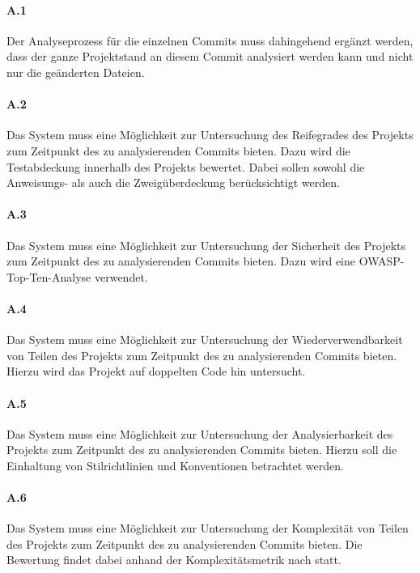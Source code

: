 \documentclass[
	oneside,  %
	ngerman, 
	final, 
	11pt, 
	a4paper, 
	1.1headlines, 
	headinclude=false, 
	footinclude=false, 
	mpinclude=false, 
	pagesize, 
	onecolumn, 
	titlepage, 
	parskip=half, 
	headsepline, 
	chapterprefix=false, 
	version=first, 
	listof=totoc, 
	bibliography=totoc, 
	toc=graduated, 
	fleqn
]{scrbook}
\begin{document}
\paragraph{A.1}
Der Analyseprozess für die einzelnen Commits muss dahingehend ergänzt werden, dass der ganze Projektstand an diesem Commit analysiert werden kann und nicht nur die geänderten Dateien.

\paragraph{A.2}
Das System muss eine Möglichkeit zur Untersuchung des Reifegrades des Projekts zum Zeitpunkt des zu analysierenden Commits bieten.
Dazu wird die Testabdeckung innerhalb des Projekts bewertet. Dabei sollen sowohl die Anweisungs- als auch die Zweigüberdeckung berücksichtigt werden.

\paragraph{A.3}
Das System muss eine Möglichkeit zur Untersuchung der Sicherheit des Projekts zum Zeitpunkt des zu analysierenden Commits bieten.
Dazu wird eine \acs{OWASP}-Top-Ten-Analyse verwendet.

\paragraph{A.4}
Das System muss eine Möglichkeit zur Untersuchung der Wiederverwendbarkeit von Teilen des Projekts zum Zeitpunkt des zu analysierenden Commits bieten.
Hierzu wird das Projekt auf doppelten Code hin untersucht.

\paragraph{A.5}
Das System muss eine Möglichkeit zur Untersuchung der Analysierbarkeit des Projekts zum Zeitpunkt des zu analysierenden Commits bieten.
Hierzu soll die Einhaltung von Stilrichtlinien und Konventionen betrachtet werden.

\paragraph{A.6}
Das System muss eine Möglichkeit zur Untersuchung der Komplexität von Teilen des Projekts zum Zeitpunkt des zu analysierenden Commits bieten.
Die Bewertung findet dabei anhand der Komplexitätsmetrik nach \cite{MC1976} statt.
\end{document}
